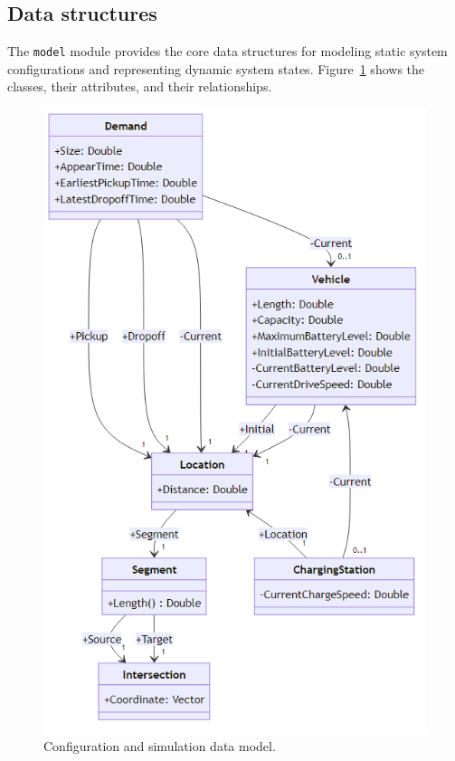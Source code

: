 \documentclass[a4paper,twoside]{article}
\begin{document}
	
	\subsection{Data structures}
	\label{sec:data-model}
	
	The \texttt{model} module provides the core data structures for modeling static system configurations and representing dynamic system states.
	Figure~\ref{fig:data-model} shows the classes, their attributes, and their relationships.
	
	\begin{figure}[!ht]
		\centering
		\includegraphics[scale=0.4]{../../diagrams/model/classes-v0.2.png}
		\caption{Configuration and simulation data model.}
		\label{fig:data-model}
	\end{figure}
	
\end{document}
